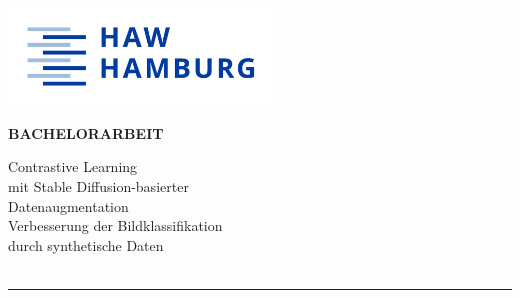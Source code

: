 \begin{titlepage}
  \color{haw}
  \raggedright
  \hfill\includegraphics[width=7cm]{HAW_Marke_RGB_300dpi}\\

  \vspace{5cm}

  \setmainfont{Open Sans}
  \small
  \textbf{BACHELORARBEIT}

  \vspace{8mm}

  \begin{minipage}{0.8\linewidth}
    \setmainfont{Martel Heavy}
    \LARGE
    Contrastive Learning\\[1mm]
    mit Stable Diffusion-basierter\\[1mm]
    Datenaugmentation\\[1mm]
    \setmainfont{Open Sans}
    \Large
    Verbesserung der Bildklassifikation\\[1mm]
    durch synthetische Daten\\[1mm]
    \,\rule{11mm}{1.2mm}
  \end{minipage}

  \vspace{1cm}


\end{titlepage}
